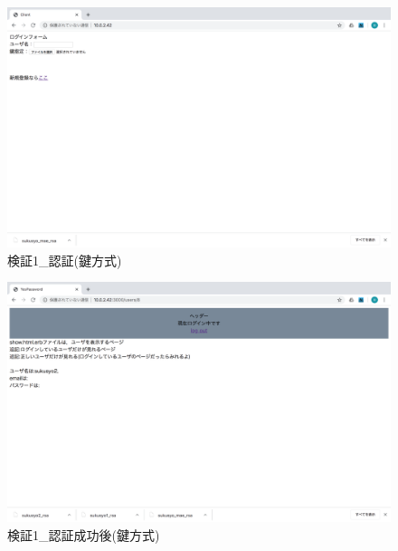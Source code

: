     \vspace{4cm}%
    \begin{figure}[H]
        \includegraphics[width=15cm]{./fig/chapter4/inspect_1/key_screnn/login.png}
        \caption{検証1\_認証(鍵方式)}
        \label{検証１認証(鍵方式)}
    \end{figure}

    \vspace{4cm}%
    \begin{figure}[H]
        \includegraphics[width=15cm]{./fig/chapter4/inspect_1/key_screnn/login-after2.png}
        \caption{検証1\_認証成功後(鍵方式)}
        \label{検証１認証成功後(鍵方式)}
    \end{figure}





    

